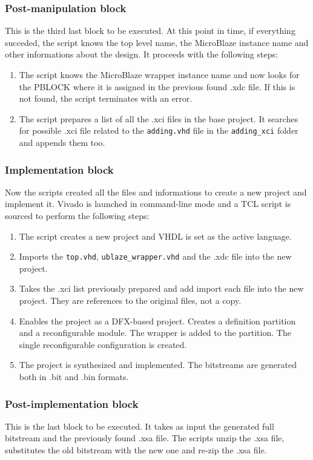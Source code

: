 \subsubsection{Post-manipulation block}
This is the third last block to be executed. At this point in time, if everything succeded, the script knows the top level name, the MicroBlaze instance name and other informations about the design. It proceeds with the following steps:

\begin{enumerate}
    \item The script knows the MicroBlaze wrapper instance name and now looks for the PBLOCK where it is assigned in the previous found .xdc file. If this is not found, the script terminates with an error.
    \item The script prepares a list of all the .xci files in the base project. It searches for possible .xci file related to the \texttt{adding.vhd} file in the \texttt{adding_xci} folder and appends them too.
\end{enumerate}

\subsubsection{Implementation block}
Now the scripts created all the files and informations to create a new project and implement it. Vivado is launched in command-line mode and a TCL script is sourced to perform the following steps:

\begin{enumerate}
    \item The script creates a new project and VHDL is set as the active language.
    \item Imports the \texttt{top.vhd}, \texttt{ublaze\_wrapper.vhd} and the .xdc file into the new project.
    \item Takes the .xci list previously prepared and add import each file into the new project. They are references to the original files, not a copy.
    \item Enables the project as a DFX-based project. Creates a definition partition and a reconfigurable module. The wrapper is added to the partition. The single reconfigurable configuration is created.
    \item The project is synthesized and implemented. The bitstreams are generated both in .bit and .bin formats.
\end{enumerate}

\subsubsection{Post-implementation block}
This is the last block to be executed. It takes as input the generated full bitstream and the previously found .xsa file. The scripts unzip the .xsa file, substitutes the old bitstream with the new one and re-zip the .xsa file.


